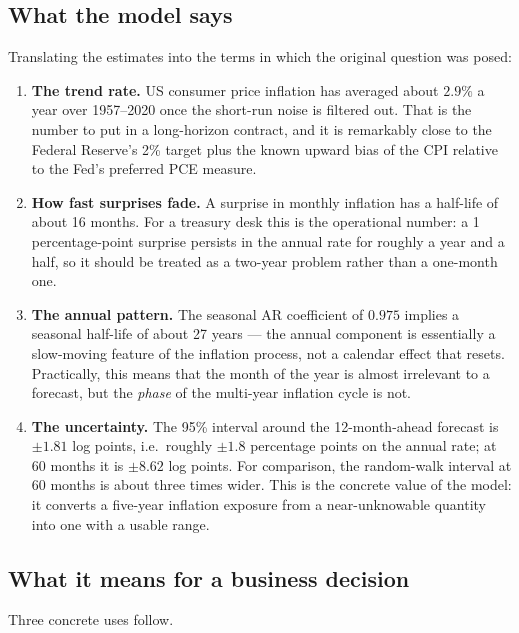 \subsection{What the model says}

Translating the estimates into the terms in which the original question was posed:

\begin{enumerate}[leftmargin=1.6em,itemsep=0.35em]
\item \textbf{The trend rate.} US consumer price inflation has averaged about
$2.9\%$ a year over 1957--2020 once the short-run noise is filtered out. That is
the number to put in a long-horizon contract, and it is remarkably close to the
Federal Reserve's 2\% target plus the known upward bias of the CPI relative to
the Fed's preferred PCE measure.

\item \textbf{How fast surprises fade.} A surprise in monthly inflation has a
half-life of about 16 months. For a treasury desk this is the operational number:
a 1 percentage-point surprise persists in the annual rate for roughly a year and a
half, so it should be treated as a two-year problem rather than a one-month one.

\item \textbf{The annual pattern.} The seasonal AR coefficient of $0.975$ implies a
seasonal half-life of about 27 years --- the annual component is essentially a
slow-moving feature of the inflation process, not a calendar effect that resets.
Practically, this means that the month of the year is almost irrelevant to a
forecast, but the \emph{phase} of the multi-year inflation cycle is not.

\item \textbf{The uncertainty.} The 95\% interval around the 12-month-ahead
forecast is $\pm1.81$ log points, i.e.\ roughly $\pm1.8$ percentage points on the
annual rate; at 60 months it is $\pm8.62$ log points. For comparison, the
random-walk interval at 60 months is about three times wider. This is the concrete
value of the model: it converts a five-year inflation exposure from a
near-unknowable quantity into one with a usable range.
\end{enumerate}

\subsection{What it means for a business decision}

Three concrete uses follow.

